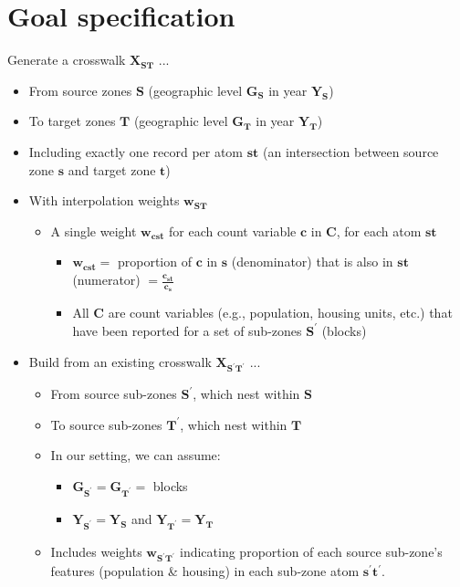 \documentclass{article}
\begin{document}
\section{Goal specification}
Generate a crosswalk $\bm{X_{\mathbf{ST}}}$ ...
\begin{itemize}
  \item From source zones $\mathbf{S}$ (geographic level $\bm{G_{\mathbf{S}}}$ in year $\bm{Y_{\mathbf{S}}}$)
  \item To target zones $\mathbf{T}$ (geographic level $\bm{G_{\mathbf{T}}}$ in year $\bm{Y_{\mathbf{T}}}$)
  \item Including exactly one record per atom $\bm{st}$ (an intersection between source zone $\bm{s}$ and target zone $\bm{t}$)
  \item With interpolation weights $\bm{w_{\mathbf{ST}}}$
    \begin{itemize}
    \item A single weight $\bm{w_{\mathbf{cst}}}$ for each count variable $\bm{c}$ in $\mathbf{C}$, for each atom $\bm{st}$
      \begin{itemize}
      \item $\bm{w_{\mathbf{cst}}} =$ proportion of $\bm{c}$ in $\bm{s}$ (denominator) that is also in $\bm{st}$ (numerator) $= \displaystyle \frac{\bm{c_{st}}}{\bm{c_{s}}}$
      \item All $\mathbf{C}$ are count variables (e.g., population, housing units, etc.) that have been reported for a set of sub-zones $\mathbf{S^\prime}$ (blocks)
      \end{itemize}
    \end{itemize}
  \item Build from an existing crosswalk $\bm{X_{\mathbf{S^\prime T^\prime}}}$ ...
    \begin{itemize}
    \item From source sub-zones $\mathbf{S^\prime}$, which nest within $\mathbf{S}$
    \item To source sub-zones $\mathbf{T^\prime}$, which nest within $\mathbf{T}$
    \item In our setting, we can assume:
      \begin{itemize}
      \item $\bm{G_{\mathbf{S^\prime}}} = \bm{G_{\mathbf{T^\prime}}} =$ blocks
      \item $\bm{Y_{\mathbf{S^\prime}}} = \bm{Y_{\mathbf{S}}}$ and $\bm{Y_{\mathbf{T^\prime}}} = \bm{Y_{\mathbf{T}}}$
      \end{itemize}
    \item Includes weights $\bm{w_{\mathbf{S^\prime T^\prime}}}$ indicating proportion of each source sub-zone's features (population \& housing) in each sub-zone atom $\bm{s^\prime t^\prime}$.

\end{itemize}
\end{itemize}
\end{document}
